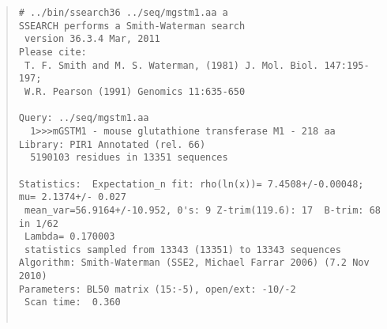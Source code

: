 \begin{footnotesize}
\begin{quote}
\begin{verbatim}
# ../bin/ssearch36 ../seq/mgstm1.aa a
SSEARCH performs a Smith-Waterman search
 version 36.3.4 Mar, 2011
Please cite:
 T. F. Smith and M. S. Waterman, (1981) J. Mol. Biol. 147:195-197; 
 W.R. Pearson (1991) Genomics 11:635-650

Query: ../seq/mgstm1.aa
  1>>>mGSTM1 - mouse glutathione transferase M1 - 218 aa
Library: PIR1 Annotated (rel. 66) 
  5190103 residues in 13351 sequences

Statistics:  Expectation_n fit: rho(ln(x))= 7.4508+/-0.00048; mu= 2.1374+/- 0.027
 mean_var=56.9164+/-10.952, 0's: 9 Z-trim(119.6): 17  B-trim: 68 in 1/62
 Lambda= 0.170003
 statistics sampled from 13343 (13351) to 13343 sequences
Algorithm: Smith-Waterman (SSE2, Michael Farrar 2006) (7.2 Nov 2010)
Parameters: BL50 matrix (15:-5), open/ext: -10/-2
 Scan time:  0.360


\end{verbatim}
\end{quote}
\end{footnotesize}
